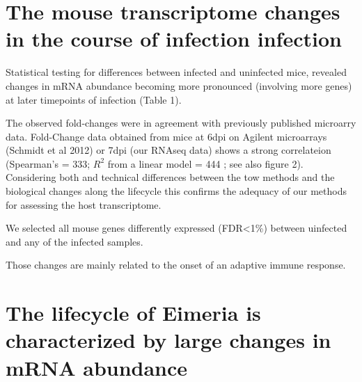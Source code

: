 \documentclass{bmcart}
\begin{document}


\section*{The mouse transcriptome changes in the course of infection infection}

Statistical testing for differences between infected and uninfected
mice, revealed changes in mRNA abundance becoming more pronounced
(involving more genes) at later timepoints of infection (Table 1).

The observed fold-changes were in agreement with previously published
microarry data. Fold-Change data obtained from mice at 6dpi on Agilent
microarrays (Schmidt et al 2012) or 7dpi (our RNAseq data) shows a
strong correlateion (Spearman's \rho = 333; $R^2$ from a linear model
= 444 ; see also figure 2). Considering both and technical differences
between the tow methods and the biological changes along the lifecycle
this confirms the adequacy of our methods for assessing the host
transcriptome.

We selected all mouse genes differently expressed (FDR<1\%) between
uinfected and any of the infected samples.






Those changes are mainly related to the onset of an
adaptive immune response.




\section*{The lifecycle of Eimeria is characterized by large changes in mRNA abundance}
\end{document}
